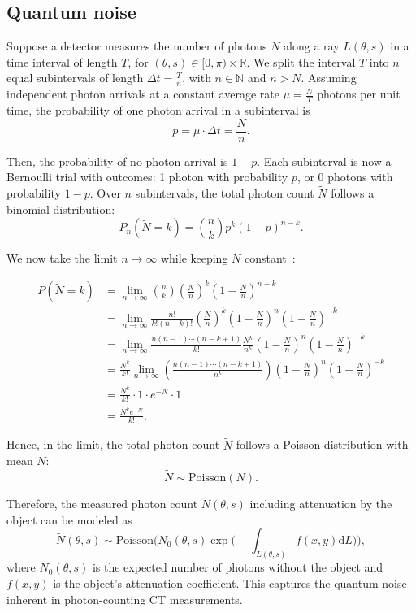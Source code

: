 \documentclass[12pt,a4paper]{article}
\begin{document}
\subsection{Quantum noise}

Suppose a detector measures the number of photons \(N\) along a ray $L(\theta, s)$ in a time interval of length \(T\), for \((\theta, s) \in [0, \pi) \times \mathbb{R}\). We split the interval \(T\) into \(n\) equal subintervals of length \(\Delta t = \frac{T}{n}\), with \(n \in \mathbb{N}\) and \(n > N\). Assuming independent photon arrivals at a constant average rate \(\mu = \frac{N}{T}\) photons per unit time, the probability of one photon arrival in a subinterval is
\[
p = \mu \cdot \Delta t = \frac{N}{n}.
\]

Then, the probability of no photon arrival is \(1-p\). Each subinterval is now a Bernoulli trial with outcomes: 1 photon with probability \(p\), or 0 photons with probability \(1-p\). Over \(n\) subintervals, the total photon count \(\tilde N\) follows a binomial distribution:
\[
P_n(\tilde N = k) = \binom{n}{k} p^k (1-p)^{n-k}.
\]

We now take the limit \(n \to \infty\) while keeping \(N\) constant~\cite{Chamberlain2016Poisson}:

\[
\begin{aligned}
P(\tilde N = k) 
&= \lim_{n \to \infty} \binom{n}{k} \left(\frac{N}{n}\right)^k \left(1 - \frac{N}{n}\right)^{n-k} \\[2mm]
&= \lim_{n \to \infty} \frac{n!}{k!(n-k)!} \left(\frac{N}{n}\right)^k \left(1 - \frac{N}{n}\right)^{n} \left(1 - \frac{N}{n}\right)^{-k} \\[1mm]
&= \lim_{n \to \infty} \frac{n(n-1)\cdots(n-k+1)}{k!} \frac{N^k}{n^k} \left(1 - \frac{N}{n}\right)^n \left(1 - \frac{N}{n}\right)^{-k} \\[1mm]
&= \frac{N^k}{k!} \lim_{n \to \infty} \left( \frac{n(n-1)\cdots(n-k+1)}{n^k} \right) \left(1 - \frac{N}{n}\right)^n \left(1 - \frac{N}{n}\right)^{-k} \\[1mm]
&= \frac{N^k}{k!} \cdot 1 \cdot e^{-N} \cdot 1 \\[1mm]
&= \frac{N^k e^{-N}}{k!}.
\end{aligned}
\]

Hence, in the limit, the total photon count \(\tilde N\) follows a Poisson distribution with mean \(N\):
\[
\tilde N \sim \mathrm{Poisson}(N).
\]

Therefore, the measured photon count \(\tilde{N}(\theta, s)\) including attenuation by the object can be modeled as
\[
\tilde{N}(\theta, s) \sim \mathrm{Poisson}\Big(N_0(\theta, s) \exp\Big(-\int_{L(\theta, s)} f(x,y) \mathrm{d}L \Big)\Big),
\]
where \(N_0(\theta, s)\) is the expected number of photons without the object and \(f(x,y)\) is the object's attenuation coefficient. This captures the quantum noise inherent in photon-counting CT measurements.
\end{document}
